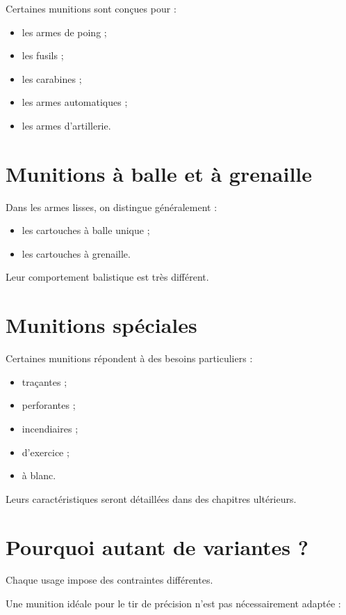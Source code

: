 Certaines munitions sont conçues pour :

\begin{itemize}
    \item les armes de poing ;
    \item les fusils ;
    \item les carabines ;
    \item les armes automatiques ;
    \item les armes d'artillerie.
\end{itemize}

\section{Munitions à balle et à grenaille}

Dans les armes lisses, on distingue généralement :

\begin{itemize}
    \item les cartouches à balle unique ;
    \item les cartouches à grenaille.
\end{itemize}

Leur comportement balistique est très différent.

\section{Munitions spéciales}

Certaines munitions répondent à des besoins particuliers :

\begin{itemize}
    \item traçantes ;
    \item perforantes ;
    \item incendiaires ;
    \item d'exercice ;
    \item à blanc.
\end{itemize}

Leurs caractéristiques seront détaillées dans des chapitres ultérieurs.

\section{Pourquoi autant de variantes ?}

Chaque usage impose des contraintes différentes.

Une munition idéale pour le tir de précision n'est pas nécessairement adaptée :

